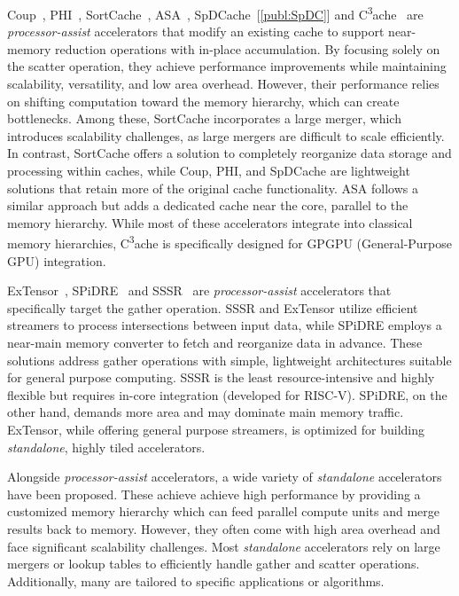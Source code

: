 Coup~\cite{Zhang2015_Coup}, PHI~\cite{Mukkara2019_PHI}, SortCache~\cite{Srikanth2021_SortCache}, ASA~\cite{Zhang2022_ASA}, SpDCache~[\ref{publ:SpDC}] and C\textsuperscript{3}ache~\cite{Li2025_C3ache} are \textit{processor-assist} accelerators that modify an existing cache to support near-memory \gls{reduction} operations with in-place accumulation.
By focusing solely on the \gls{scatter} operation, they achieve performance improvements while maintaining scalability, versatility, and low area overhead.
However, their performance relies on shifting computation toward the memory hierarchy, which can create bottlenecks.
Among these, SortCache incorporates a large merger, which introduces scalability challenges, as large mergers are difficult to scale efficiently.
In contrast, SortCache offers a solution to completely reorganize data storage and processing within caches, while Coup, PHI, and SpDCache are lightweight solutions that retain more of the original cache functionality.
ASA follows a similar approach but adds a dedicated cache near the core, parallel to the memory hierarchy.
While most of these accelerators integrate into classical memory hierarchies, C\textsuperscript{3}ache is specifically designed for GPGPU (General-Purpose GPU) integration.

ExTensor~\cite{Hegde2019_ExTensor}, SPiDRE~\cite{Barredo2019_SPiDRE} and SSSR~\cite{Scheffler2023_SSSR} are \textit{processor-assist} accelerators that specifically target the \gls{gather} operation.
SSSR and ExTensor utilize efficient streamers to process \glspl{intersection} between input data, while SPiDRE employs a near-main memory converter to fetch and reorganize data in advance.
These solutions address \gls{gather} operations with simple, lightweight architectures suitable for general purpose computing.
SSSR is the least resource-intensive and highly flexible but requires in-core integration (developed for RISC-V).
SPiDRE, on the other hand, demands more area and may dominate main memory traffic.
ExTensor, while offering general purpose streamers, is optimized for building \textit{standalone}, highly tiled accelerators.

Alongside \textit{processor-assist} accelerators, a wide variety of \textit{standalone} accelerators have been proposed.
These achieve achieve high performance by providing a customized memory hierarchy which can feed parallel compute units and merge results back to memory.
However, they often come with high area overhead and face significant scalability challenges.
Most \textit{standalone} accelerators rely on large mergers or lookup tables to efficiently handle \gls{gather} and \gls{scatter} operations.
Additionally, many are tailored to specific applications or algorithms.

